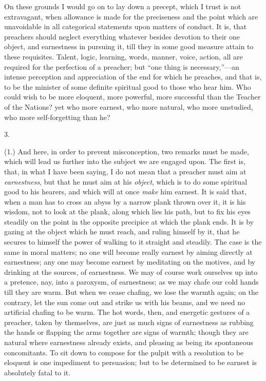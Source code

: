 On these grounds I would go on to lay down a precept, which I trust
is not extravagant, when allowance is made for the preciseness and the
point which are unavoidable in all categorical statements upon matters
of conduct. It is, that preachers should neglect everything whatever
besides devotion to their one object, and earnestness in pursuing it,
till they in some good measure attain to these requisites. Talent,
logic, learning, words, manner, voice, action, all are required for
the perfection of a preacher; but ``one thing is necessary,''—an
intense perception and appreciation of the end for which he preaches,
and that is, to be the minister of some definite spiritual good to
those who hear him. Who could wish to be more eloquent, more powerful,
more successful than the Teacher of the Nations? yet who more earnest,
who more natural, who more unstudied, who more self-forgetting than
he?

3.

(1.) And here, in order to prevent misconception, two remarks must
be made, which will lead us further into the subject we are engaged
upon. The first is, that, in what I have been saying, I do not mean
that a preacher must aim at \emph{earnestness}, but that he must
aim at his \emph{object}, which is to do some spiritual good to his
hearers, and which will at once \emph{make} him earnest. It is said
that, when a man has to cross an abyss by a narrow plank thrown over
it, it is his wisdom, not to look at the plank, along which lies his
path, but to fix his eyes steadily on the point in the opposite
precipice at which the plank ends. It is by gazing at the object which
he must reach, and ruling himself by it, that he secures to himself
the power of walking to it straight and steadily. The case is the same
in moral matters; no one will become really earnest by aiming directly
at earnestness; any one may become earnest by meditating on the
motives, and by drinking at the sources, of earnestness. We may of
course work ourselves up into a pretence, nay, into a paroxysm, of
earnestness; as we may chafe our cold hands till they are warm. But
when we cease chafing, we lose the warmth again; on the contrary, let
the sun come out and strike us with his beams, and we need no
artificial chafing to be warm. The hot words, then, and energetic
gestures of a preacher, taken by themselves, are just as much signs of
earnestness as rubbing the hands or flapping the arms together are
signs of warmth; though they are natural where earnestness already
exists, and pleasing as being its spontaneous concomitants. To sit
down to compose for the pulpit with a resolution to be eloquent is one
impediment to persuasion; but to be determined to be earnest is
absolutely fatal to it.

